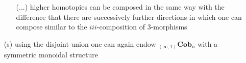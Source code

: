 \begin{enumerate}
\begin{enumerate}
\item[(...)]
higher homotopies can be composed in the same way with the difference that there are successively further directions in which one can compose similar to the $iii$-composition of $3$-morphisms
\end{enumerate}

\item[(s)]
using the disjoint union one can again endow ${_{(\infty,1)}}\mathbf{Cob}_{n}$ with a symmetric monoidal structure
\end{enumerate}
